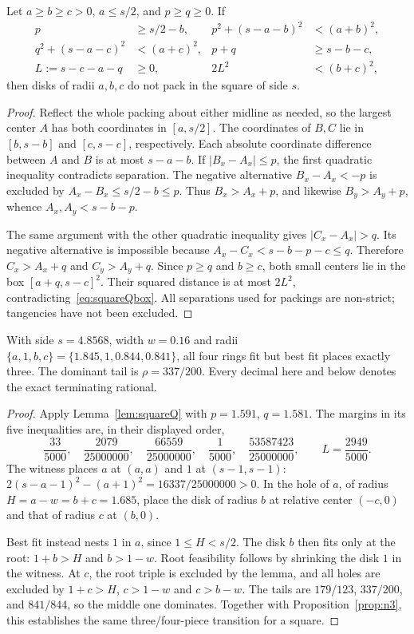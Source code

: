 \begin{lemma}\label{lem:squareQ}
Let $a\ge b\ge c>0$, $a\le s/2$, and $p\ge q\ge0$. If
\begin{align}
 p&\ge s/2-b, & p^2+(s-a-b)^2&<(a+b)^2,\label{eq:squareQb}\\
 q^2+(s-a-c)^2&<(a+c)^2, &p+q&\ge s-b-c,\label{eq:squareQc}\\
 L:=s-c-a-q&\ge0, &2L^2&<(b+c)^2,\label{eq:squareQbox}
\end{align}
then disks of radii $a,b,c$ do not pack in the square of side $s$.
\end{lemma}
\begin{proof}
Reflect the whole packing about either midline as needed, so the
largest center $A$ has both coordinates in $[a,s/2]$. The coordinates
of $B,C$ lie in $[b,s-b]$ and $[c,s-c]$, respectively. Each absolute
coordinate difference between $A$ and $B$ is at most $s-a-b$.
If $|B_x-A_x|\le p$, the first quadratic inequality contradicts
separation. The negative alternative $B_x-A_x<-p$ is excluded by
$A_x-B_x\le s/2-b\le p$. Thus $B_x>A_x+p$, and likewise
$B_y>A_y+p$, whence $A_x,A_y<s-b-p$.

The same argument with the other quadratic inequality gives
$|C_x-A_x|>q$. Its negative alternative is impossible because
$A_x-C_x<s-b-p-c\le q$. Therefore $C_x>A_x+q$ and
$C_y>A_y+q$. Since $p\ge q$ and $b\ge c$, both small centers lie
in the box $[a+q,s-c]^2$. Their squared distance is at most $2L^2$,
contradicting~\eqref{eq:squareQbox}. All separations used for
packings are non-strict; tangencies have not been excluded.
\end{proof}

\begin{proposition}\label{prop:squareD}
With side $s=4.8568$, width $w=0.16$ and radii
$\{a,1,b,c\}=\{1.845,1,0.844,0.841\}$, all four rings fit but
best fit places exactly three. The dominant tail is $\rho=337/200$.
Every decimal here and below denotes the exact terminating rational.
\end{proposition}
\begin{proof}
Apply Lemma~\ref{lem:squareQ} with $p=1.591$, $q=1.581$.
The margins in its five inequalities are, in their displayed order,
\[
 \frac{33}{5000},\quad\frac{2079}{25000000},\quad
 \frac{66559}{25000000},\quad\frac1{5000},\quad
 \frac{53587423}{25000000},\qquad L=\frac{2949}{5000}.
\]
The witness places $a$ at $(a,a)$ and $1$ at $(s-1,s-1)$:
$2(s-a-1)^2-(a+1)^2=16337/25000000>0$. In the hole of $a$,
of radius $H=a-w=b+c=1.685$, place the disk of radius $b$ at
relative center $(-c,0)$ and that of radius $c$ at $(b,0)$.

Best fit instead nests $1$ in $a$, since $1\le H<s/2$.
The disk $b$ then fits only at the root: $1+b>H$ and $b>1-w$.
Root feasibility follows by shrinking the disk $1$ in the witness.
At $c$, the root triple is excluded by the lemma, and all holes are
excluded by $1+c>H$, $c>1-w$ and $c>b-w$. The tails are
$179/123$, $337/200$, and $841/844$, so the middle one dominates.
Together with Proposition~\ref{prop:n3}, this establishes the same
three/four-piece transition for a square.
\end{proof}

